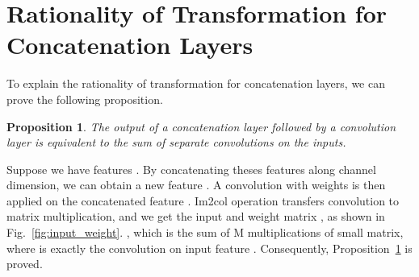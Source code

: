 \documentclass[letterpaper]{article} \usepackage{aaai22}  \usepackage{times}  \usepackage{helvet}  \usepackage{courier}  \usepackage[hyphens]{url}  \usepackage{graphicx} \urlstyle{rm} \def\UrlFont{\rm}  \usepackage{natbib}  \usepackage{caption} \DeclareCaptionStyle{ruled}{labelfont=normalfont,labelsep=colon,strut=off} \frenchspacing  \setlength{\pdfpagewidth}{8.5in}  \setlength{\pdfpageheight}{11in}
\newtheorem{MyProp}{Proposition}
\begin{document}
\section{Rationality of 
Transformation for Concatenation Layers}
To explain the rationality of transformation for concatenation layers, we can prove the following proposition.

\begin{MyProp}
The output of a concatenation layer followed by a convolution layer is equivalent to the sum of separate convolutions on the inputs.
\label{prop:concat_sum}
\end{MyProp}

Suppose we have  features . By concatenating theses features along channel dimension, we can obtain a new feature .
A convolution with weights  is then applied on the concatenated feature . 
Im2col operation transfers convolution to matrix multiplication, and we get the input and weight matrix , as shown in Fig.~\ref{fig:input_weight}. , which is the sum of M multiplications of small matrix, where  is exactly the convolution on input feature . Consequently, Proposition~\ref{prop:concat_sum} is proved.
\end{document}
